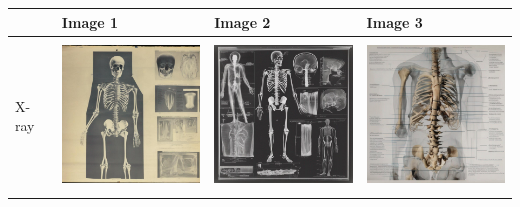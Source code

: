 \begin{table}[H]
\centering
\begin{tabularx}{\linewidth}{@{}>{\centering\arraybackslash}m{3cm}>{\centering\arraybackslash}X>{\centering\arraybackslash}X>{\centering\arraybackslash}X@{}}
\toprule
 & Image 1 & Image 2 & Image 3 \\
\midrule
X-ray & \includegraphics[valign=M,width=\linewidth,height=4cm,keepaspectratio]{main/content/images/prior_concepts_sd/xl/xray/xray-0.jpg} & \includegraphics[valign=M,width=\linewidth,height=4cm,keepaspectratio]{main/content/images/prior_concepts_sd/xl/xray/xray-1.jpg} & \includegraphics[valign=M,width=\linewidth,height=4cm,keepaspectratio]{main/content/images/prior_concepts_sd/xl/xray/xray-2.jpg} \\
\midrule

\end{tabularx}
\end{table}
